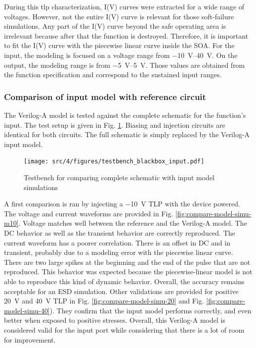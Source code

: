 During this \gls{tlp} characterization, I(V) curves were extracted for a wide range of voltages.
However, not the entire I(V) curve is relevant for those soft-failure simulations.
Any part of the I(V) curve beyond the safe operating area is irrelevant because after that the function is destroyed.
Therefore, it is important to fit the I(V) curve with the piecewise linear curve inside the SOA.
For the input, the modeling is focused on a voltage range from \SIrange{-10}{40}{\volt}.
On the output, the modeling range is from \SIrange{-5}{5}{\volt}.
Those values are obtained from the function specification and correspond to the sustained input ranges.

\subsubsection{Comparison of input model with reference circuit}

The Verilog-A model is tested against the complete schematic for the function's input.
The test setup is given in Fig. \ref{fig:compare-veriloga-model-input}.
Biasing and injection circuits are identical for both circuits.
The full schematic is simply replaced by the Verilog-A input model.

\begin{figure}[!h]
  \centering
  \texttt{[image: src/4/figures/testbench\_blackbox\_input.pdf]}
  \caption{Testbench for comparing complete schematic with input model simulations}
  \label{fig:compare-veriloga-model-input}
\end{figure}

A first comparison is ran by injecting a \SI{-10}{\volt} TLP with the device powered.
The voltage and current waveforms are provided in Fig. \ref{fig:compare-model-simu-m10}.
Voltage matches well between the reference and the Verilog-A model.
The DC behavior as well as the transient behavior are correctly reproduced.
The current waveform has a poorer correlation.
There is an offset in DC and in transient, probably due to a modeling error with the piecewise linear curve.
There are two large spikes at the beginning and the end of the pulse that are not reproduced.
This behavior was expected because the piecewise-linear model is not able to reproduce this kind of dynamic behavior.
Overall, the accuracy remains acceptable for an ESD simulation.
Other validations are provided for positive \SI{20}{\volt} and \SI{40}{\volt} TLP in Fig. \ref{fig:compare-model-simu-20} and Fig. \ref{fig:compare-model-simu-40}).
They confirm that the input model performs correctly, and even better when exposed to positive stresses.
Overall, this Verilog-A model is considered valid for the input port while considering that there is a lot of room for improvement.

